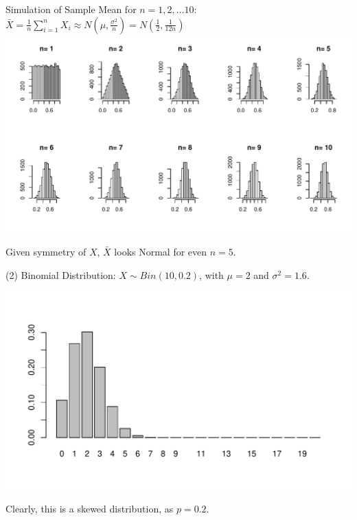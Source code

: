 \documentclass[t,xcolor=pdftex,dvipsnames,table]{beamer}
\makeatletter
\def\maxwidth{ %
  \ifdim\Gin@nat@width>\linewidth
    \linewidth
  \else
    \Gin@nat@width
  \fi
}
\newenvironment{knitrout}{}{} %
\makeatother
\begin{document}
\begin{frame}{}

Simulation of Sample Mean for $n=1,2,\ldots 10$: $\bar{X} = \frac{1}{n} \sum_{i=1}^{n} X_{i}  \approx N(\mu, \frac{\sigma^2}{n}) = N(\frac{1}{2},\frac{1}{12n})$  \\


\begin{knitrout}
\color{fgcolor}
\includegraphics[width=\maxwidth]{figure/unnamed-chunk-5-1} 

\end{knitrout}
Given symmetry of $X$, $\bar{X}$ looks Normal for even $n=5$.
\end{frame}

\begin{frame}{}

(2) Binomial Distribution: $X \sim Bin(10,0.2)$, with
$\mu = 2$ and $\sigma^2 = 1.6$.


\begin{knitrout}
\color{fgcolor}
\includegraphics[width=\maxwidth]{figure/unnamed-chunk-6-1} 

\end{knitrout}

Clearly, this is a skewed distribution, as $p=0.2$.
\end{frame}
\end{document}
